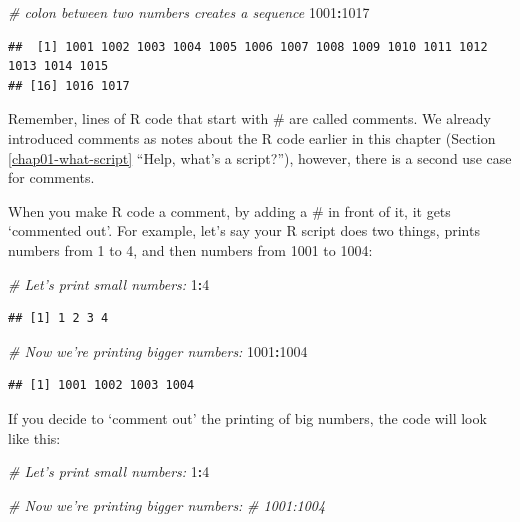 \documentclass[
  12pt,
  krantz2]{krantz}
\makeatletter
\newenvironment{Shaded}{\begin{snugshade}}{\end{snugshade}}
\newcommand{\CommentTok}[1]{\textcolor[rgb]{0.56,0.35,0.01}{\textit{#1}}}
\newcommand{\DecValTok}[1]{\textcolor[rgb]{0.00,0.00,0.81}{#1}}
\newcommand{\OperatorTok}[1]{\textcolor[rgb]{0.81,0.36,0.00}{\textbf{#1}}}
\newenvironment{kframe}{%
\medskip{}
\setlength{\fboxsep}{.8em}
 \def\at@end@of@kframe{}%
 \ifinner\ifhmode%
  \def\at@end@of@kframe{\end{minipage}}%
  \begin{minipage}{\columnwidth}%
 \fi\fi%
 \def\FrameCommand##1{\hskip\@totalleftmargin \hskip-\fboxsep
 \colorbox{shadecolor}{##1}\hskip-\fboxsep
     \hskip-\linewidth \hskip-\@totalleftmargin \hskip\columnwidth}%
 \MakeFramed {\advance\hsize-\width
   \@totalleftmargin\z@ \linewidth\hsize
   \@setminipage}}%
 {\par\unskip\endMakeFramed%
 \at@end@of@kframe}
\renewenvironment{Shaded}{\begin{kframe}}{\end{kframe}}
\makeatother
\begin{document}
\begin{Shaded}
\begin{Highlighting}[]
\CommentTok{# colon between two numbers creates a sequence}
\DecValTok{1001}\OperatorTok{:}\DecValTok{1017}
\end{Highlighting}
\end{Shaded}

\begin{verbatim}
##  [1] 1001 1002 1003 1004 1005 1006 1007 1008 1009 1010 1011 1012 1013 1014 1015
## [16] 1016 1017
\end{verbatim}

Remember, lines of R code that start with \# are called comments.
We already introduced comments as notes about the R code earlier in this chapter (Section \ref{chap01-what-script} ``Help, what's a script?''), however, there is a second use case for comments.

When you make R code a comment, by adding a \# in front of it, it gets `commented out'.
For example, let's say your R script does two things, prints numbers from 1 to 4, and then numbers from 1001 to 1004:

\begin{Shaded}
\begin{Highlighting}[]
\CommentTok{# Let's print small numbers:}
\DecValTok{1}\OperatorTok{:}\DecValTok{4}
\end{Highlighting}
\end{Shaded}

\begin{verbatim}
## [1] 1 2 3 4
\end{verbatim}

\begin{Shaded}
\begin{Highlighting}[]
\CommentTok{# Now we're printing bigger numbers:}
\DecValTok{1001}\OperatorTok{:}\DecValTok{1004}
\end{Highlighting}
\end{Shaded}

\begin{verbatim}
## [1] 1001 1002 1003 1004
\end{verbatim}

If you decide to `comment out' the printing of big numbers, the code will look like this:

\begin{Shaded}
\begin{Highlighting}[]
\CommentTok{# Let's print small numbers:}
\DecValTok{1}\OperatorTok{:}\DecValTok{4}

\CommentTok{# Now we're printing bigger numbers:}
\CommentTok{# 1001:1004}
\end{Highlighting}
\end{Shaded}
\end{document}
